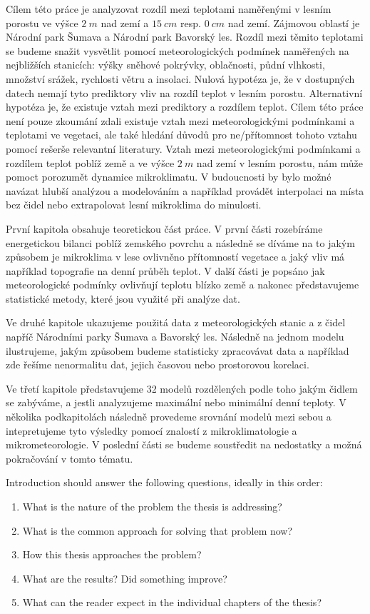 Cílem této práce je analyzovat rozdíl mezi teplotami naměřenými v lesním porostu ve výšce $\SI{2}{m}$ nad zemí a $\SI{15}{cm}$ resp. $\SI{0}{cm}$ nad zemí. Zájmovou oblastí je Národní park Šumava a Národní park Bavorský les. Rozdíl mezi těmito teplotami se budeme snažit vysvětlit pomocí meteorologických podmínek naměřených na nejbližších stanicích: výšky sněhové pokrývky, oblačnosti, půdní vlhkosti, množství srážek, rychlosti větru a insolaci. Nulová hypotéza je, že v dostupných datech nemají tyto prediktory vliv na rozdíl teplot v lesním porostu. Alternativní hypotéza je, že existuje vztah mezi prediktory a rozdílem teplot. Cílem této práce není pouze zkoumání zdali existuje vztah mezi meteorologickými podmínkami a teplotami ve vegetaci, ale také hledání důvodů pro ne/přítomnost tohoto vztahu pomocí rešerše relevantní literatury. Vztah mezi meteorologickými podmínkami a rozdílem teplot poblíž země a ve výšce $\SI{2}{m}$ nad zemí v lesním porostu, nám může pomoct porozumět dynamice mikroklimatu. V budoucnosti by bylo možné navázat hlubší analýzou a modelováním a například provádět interpolaci na místa bez čidel nebo extrapolovat lesní mikroklima do minulosti.

První kapitola obsahuje teoretickou část práce. V první části rozebíráme energetickou bilanci poblíž zemského povrchu a následně se díváme na to jakým způsobem je mikroklima v lese ovlivněno přítomností vegetace a jaký vliv má například topografie na denní průběh teplot. V další části je popsáno jak meteorologické podmínky ovlivňují teplotu blízko země a nakonec představujeme statistické metody, které jsou využité při analýze dat.

Ve druhé kapitole ukazujeme použitá data z meteorologických stanic a z čidel napříč Národními parky Šumava a Bavorský les. Následně na jednom modelu ilustrujeme, jakým způsobem budeme statisticky zpracovávat data a například zde řešíme nenormalitu dat, jejich časovou nebo prostorovou korelaci.

Ve třetí kapitole představujeme 32 modelů rozdělených podle toho jakým čidlem se zabýváme, a jestli analyzujeme maximální nebo minimální denní teploty. V několika podkapitolách následně provedeme srovnání modelů mezi sebou a intepretujeme tyto výsledky pomocí znalostí z mikroklimatologie a mikrometeorologie. V poslední části se budeme soustředit na nedostatky a možná pokračování v tomto tématu.

Introduction should answer the following questions, ideally in this order:
\begin{enumerate}
\item What is the nature of the problem the thesis is addressing?
\item What is the common approach for solving that problem now?
\item How this thesis approaches the problem?
\item What are the results? Did something improve?
\item What can the reader expect in the individual chapters of the thesis?
\end{enumerate}

